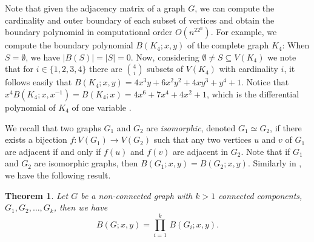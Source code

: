 \documentclass[review]{elsarticle}
\newtheorem{theorem}{Theorem}[section]
\newtheorem{algorithm}[theorem]{Algorithm}
\newcommand{\p}{\partial}
\begin{document}
\medskip
%
%
%
%
%
%
%

Note that given the adjacency matrix of a graph $G$, we can compute the cardinality and outer boundary of each subset of vertices and obtain the boundary polynomial in computational order $O(n^22^n)$. 
For example, we compute the boundary polynomial $B(K_{4};x,y)$ of the complete graph $K_{4}$: When $S = \emptyset$, we have $|B(S)| = |S| = 0$. Now, considering $\emptyset \not= S \subseteq V(K_{4})$ we note that for $i \in \{1,2,3,4\}$ there are $\binom{4}{i}$ subsets of $V(K_4)$ with cardinality $i$, it follows easily that  $B(K_{4};x,y) = 4x^{3}y + 6x^{2}y^{2} + 4xy^{3} + y^{4} + 1$. Notice that $x^{4}B(K_{4};x,x^{-1}) = B(K_{4};x) = 4x^{6}+7x^{4}+4x^{2}+1$, which is the differential polynomial of $K_{4}$ of one variable \cite{BCLS}.



We recall that two graphs $G_1$ and $G_2$ are \emph{isomorphic}, denoted $G_1 \simeq G_2$, if there exists a bijection $f: V(G_1)\to V(G_2)$ such that any two vertices $u$ and $v$ of $G_1$ are adjacent if and only if $f(u)$ and $f(v)$ are adjacent in $G_2$. Note that if $G_1$ and $G_2$ are isomorphic graphs, then $B(G_1; x,y) = B(G_2; x,y)$. 
Similarly in \cite[Theorem 2.9]{BCLS}, we have the following result.

\begin{theorem}\label{t:factors}
  Let $G$ be a non-connected graph with $k>1$ connected components, ${G_1,G_2,\ldots,G_k}$, then we have
\begin{equation}\label{eq:factors}
  B(G;x,y)=\displaystyle\prod_{i=1}^{k} \,B(G_i;x,y).
\end{equation}
\end{theorem}
\end{document}
